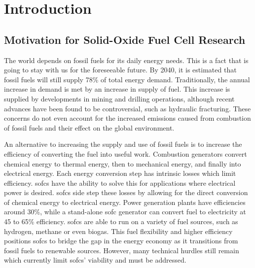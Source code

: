 
\chapter{Introduction}

\section{Motivation for Solid-Oxide Fuel Cell Research}
    The world depends on fossil fuels for its daily energy needs.
    This is a fact that is going to stay with us for the foreseeable future.
    By 2040, it is estimated that fossil fuels will still supply  78\% of total energy demand.\cite{U.S.EnergyInformationAdministration2016}
    Traditionally, the annual increase in demand is met by an increase in supply of fuel.
    This increase is supplied by developments in mining and drilling operations, although recent advances have been found to be controversial, such as hydraulic fracturing.\cite{Osborn2011,Vengosh2014}
    These concerns do not even account for the increased emissions caused from combustion of fossil fuels and their effect on the global environment.\cite{Solomon2009,Hansen1981,U.S.EnvironmentalProtectionAgency2017}

    An alternative to increasing the supply and use of fossil fuels is to increase the efficiency of converting the fuel into useful work.
    Combustion generators convert chemical energy to thermal energy, then to mechanical energy, and finally into electrical energy.
    Each energy conversion step has intrinsic losses which limit efficiency.
    \Glspl{sofc} have the ability to solve this for applications where electrical power is desired.
    \Glspl{sofc} side step these losses by allowing for the direct conversion of chemical energy to electrical energy.
    Power generation plants have efficiencies around 30\%, while a stand-alone \gls{sofc} generator can convert fuel to electricity at 45 to 65\% efficiency.\cite{Wachsman2011a,Lasseter2004}
    \Glspl{sofc} are able to run on a variety of fuel sources, such as hydrogen, methane or even biogas.\cite{Park2000}
    This fuel flexibility and higher efficiency positions \glspl{sofc} to bridge the gap in the energy economy as it transitions from fossil fuels to renewable sources.
    However, many technical hurdles still remain which currently limit \glspl{sofc}' viability and must be addressed.

